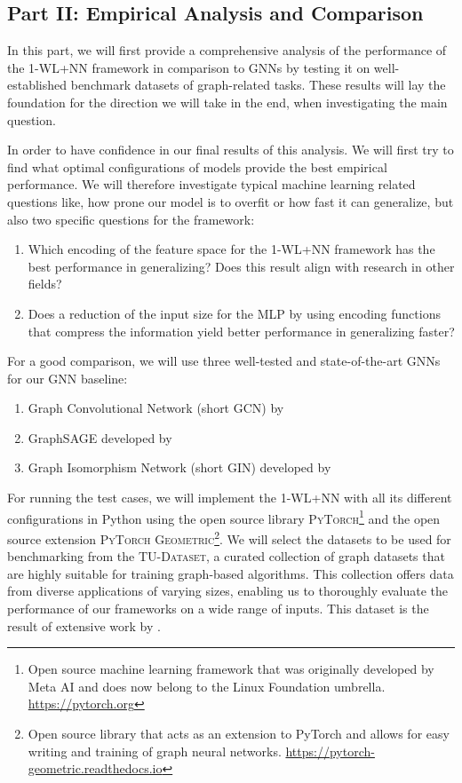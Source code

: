 \documentclass[11pt, dvipsnames, DIV=12]{scrreprt}
\theoremstyle{definition}
\newcommand{\wlnn}{\text{1-WL+NN }}
\begin{document}
\subsection{Part II: Empirical Analysis and Comparison}
In this part, we will first provide a comprehensive analysis of the performance of the 1-WL+NN framework in comparison to GNNs by testing it on well-established benchmark datasets of graph-related tasks. These results will lay the foundation for the direction we will take in the end, when investigating the main question.

In order to have confidence in our final results of this analysis. We will first try to find what optimal configurations of \wlnn models provide the best empirical performance. We will therefore investigate typical machine learning related questions like, how prone our model is to overfit or how fast it can generalize, but also two specific questions for the framework:
\begin{enumerate}[label=Q\arabic*)]
    \item Which encoding of the feature space for the 1-WL+NN framework has the best performance in generalizing? Does this result align with research in other fields?
    \item Does a reduction of the input size for the MLP by using encoding functions that compress the information yield better performance in generalizing faster?
\end{enumerate}
For a good comparison, we will use three well-tested and state-of-the-art GNNs for our GNN baseline:
\begin{enumerate}
    \item Graph Convolutional Network (short GCN) by \cite{Kip+2017}
    \item GraphSAGE developed by \cite{Ham+2017}
    \item Graph Isomorphism Network (short GIN) developed by \cite{Xu2018}
\end{enumerate}

For running the test cases, we will implement the 1-WL+NN with all its different configurations in Python using the open source library \textsc{PyTorch}\footnote{Open source machine learning framework that was originally developed by Meta AI and does now belong to the Linux Foundation umbrella. \href{https://pytorch.org}{https://pytorch.org}} and the open source extension \textsc{PyTorch Geometric}\footnote{Open source library that acts as an extension to PyTorch and allows for easy writing and training of graph neural networks. \href{https://pytorch-geometric.readthedocs.io/en/latest}{https://pytorch-geometric.readthedocs.io}}.
We will select the datasets to be used for benchmarking from the \textsc{TU-Dataset}, a curated collection of graph datasets that are highly suitable for training graph-based algorithms. This collection offers data from diverse applications of varying sizes, enabling us to thoroughly evaluate the performance of our frameworks on a wide range of inputs. This dataset is the result of extensive work by \cite{Mor+2020}.
\end{document}
